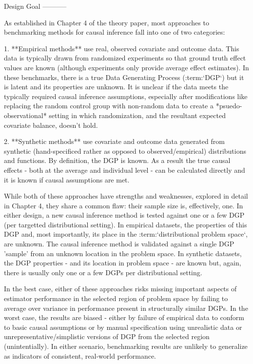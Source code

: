 \documentclass[../main.tex]{subfiles}
\begin{document}
Design Goal
-----------

As established in Chapter 4 of the theory paper, most approaches to benchmarking methods for causal inference fall into one of two categories:

1. **Empirical methods** use real, observed covariate and outcome data. This data is typically drawn from randomized experiments so that ground truth effect values are known (although experiments only provide average effect estimates). In these benchmarks, there is a true Data Generating Process (:term:`DGP`) but it is latent and its properties are unknown. It is unclear if the data meets the typically required causal inference assumptions, especially after modifications like replacing the random control group with non-random data to create a *psuedo-observational* setting in which randomization, and the resultant expected covariate balance, doesn't hold.

2. **Synthetic methods** use covariate and outcome data generated from synthetic (hand-specificed rather as opposed to observed/empirical) distributions and functions. By definition, the DGP is known. As a result the true causal effects - both at the average and individual level - can be calculated directly and it is known if causal assumptions are met.

While both of these approaches have strengths and weaknesses, explored in detail in Chapter 4, they share a common flaw: their sample size is, effectively, one. In either design, a new causal inference method is tested against one or a few DGP (per targetted distributional setting). In empirical datasets, the properties of this DGP and, most importantly, its place in the :term:`distributional problem space`, are unknown. The causal inference method is validated against a single DGP 'sample' from an unknown location in the problem space. In synthetic datasets, the DGP properties - and its location in problem space - are known but, again, there is usually only one or a few DGPs per distributional setting.

In the best case, either of these approaches risks missing important aspects of estimator performance in the selected region of problem space by failing to average over variance in performance present in structurally similar DGPs. In the worst case, the results are biased - either by failure of empirical data to conform to basic causal assumptions or by manual specification using unrealistic data or unrepresentative/simplistic versions of DGP from the selected region (unintentially). In either scenario, benchmarking results are unlikely to generalize as indicators of consistent, real-world performance.
\end{document}
